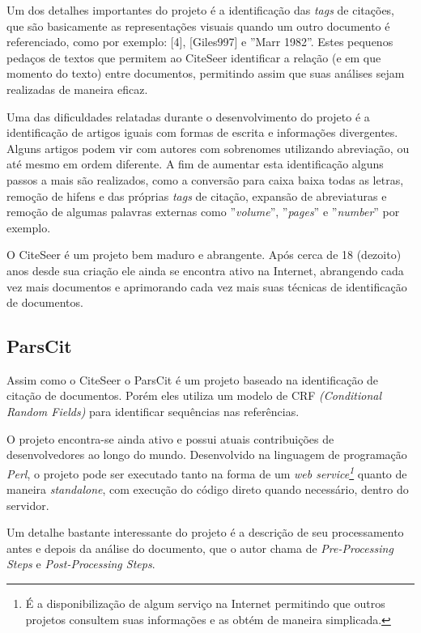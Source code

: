 Um dos detalhes importantes do projeto é a identificação das \textit{tags} de citações, que são basicamente as representações visuais quando um outro documento é referenciado, como por exemplo: [4], [Giles997] e ''Marr 1982''. Estes pequenos pedaços de textos que permitem ao CiteSeer identificar a relação (e em que momento do texto) entre documentos, permitindo assim que suas análises sejam realizadas de maneira eficaz.

Uma das dificuldades relatadas durante o desenvolvimento do projeto é a identificação de artigos iguais com formas de escrita e informações divergentes. Alguns artigos podem vir com autores com sobrenomes utilizando abreviação, ou até mesmo em ordem diferente. A fim de aumentar esta identificação alguns passos a mais são realizados, como a conversão para caixa baixa todas as letras, remoção de hifens e das próprias \textit{tags} de citação, expansão de abreviaturas e remoção de algumas palavras externas como ''\textit{volume}'', ''\textit{pages}'' e ''\textit{number}'' por exemplo.

O CiteSeer é um projeto bem maduro e abrangente. Após cerca de 18 (dezoito) anos desde sua criação ele ainda se encontra ativo na Internet, abrangendo cada vez mais documentos e aprimorando cada vez mais suas técnicas de identificação de documentos.

\subsection{ParsCit}
\label{tec-parscit}

Assim como o CiteSeer o ParsCit é um projeto baseado na identificação de citação de documentos. Porém eles utiliza um modelo de CRF \textit{(Conditional Random Fields)} para identificar sequências nas referências. 

O projeto encontra-se ainda ativo e possui atuais contribuições de desenvolvedores ao longo do mundo. Desenvolvido na linguagem de programação \textit{Perl}, o projeto pode ser executado tanto na forma de um \textit{web service\footnote{É a disponibilização de algum serviço na Internet permitindo que outros projetos consultem suas informações e as obtém de maneira simplicada.}} quanto de maneira \textit{standalone}, com execução do código direto quando necessário, dentro do servidor.

Um detalhe bastante interessante do projeto é a descrição de seu processamento antes e depois da análise do documento, que o autor chama de \textit{Pre-Processing Steps} e \textit{Post-Processing Steps}.

